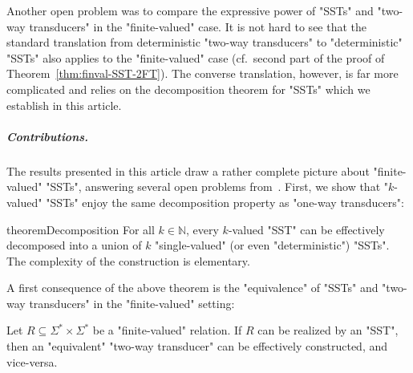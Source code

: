 \documentclass{theoretics}
\newcommand{\RestateRemark}[1]{{\normalfont\bfseries #1}}
\newcommand{\RestateInit}[1]{\newcommand{#1}{}}
\newcommand{\alp}{\Sigma}
\begin{document}
Another open problem was to compare the expressive power of "SSTs" and 
"two-way transducers" in the "finite-valued" case.
It is  not hard to see that the standard translation from deterministic
"two-way transducers" to "deterministic" "SSTs" also applies to the
"finite-valued" case (cf.~second part of the proof of Theorem~\ref{thm:finval-SST-2FT}).
The converse translation, however, is far more complicated and relies on
the decomposition theorem for "SSTs" which we establish in this article.



\medskip
\subparagraph*{\bf Contributions.} 
The results presented in this article  draw a
rather complete picture about 
"finite-valued" "SSTs", answering several open problems from~\cite{DBLP:conf/icalp/AlurD11}.
First, we show that "$k$-valued" "SSTs" enjoy the same decomposition property as
"one-way transducers":  
\RestateInit{\restateDecomposition}
\begin{restatable}{theorem}{Decomposition}
\label{thm:FiniteValuedToDecomposition}\RestateRemark{\restateDecomposition}
    For all $k \in \mathbb{N}$, 
    every $k$-valued "SST" can be effectively decomposed into a union of
    $k$ "single-valued" (or even "deterministic") "SSTs".
    The complexity of the construction is elementary.
\end{restatable}

A first consequence of the above theorem is the "equivalence" of
"SSTs" and "two-way transducers" in the "finite-valued" setting:


    
\begin{theorem}\label{thm:finval-SST-2FT}
  Let $R\subseteq \alp^*\times \alp^*$ be a "finite-valued" relation.
  If $R$ can be realized by an "SST", then an "equivalent" 
  "two-way transducer" can be effectively constructed, and vice-versa.
\end{theorem}
\end{document}
